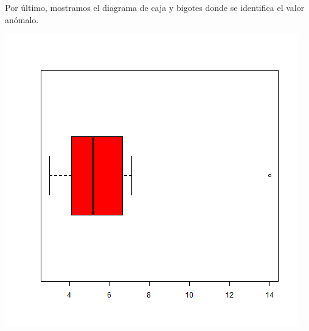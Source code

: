 \documentclass [a4paper] {article}
\begin{document}
\bigskip
Por último, mostramos el diagrama de caja y bigotes donde se identifica el valor anómalo.
\begin{Schunk}
\end{Schunk}
\includegraphics[width=\textwidth]{bigotes}
\end{document}
